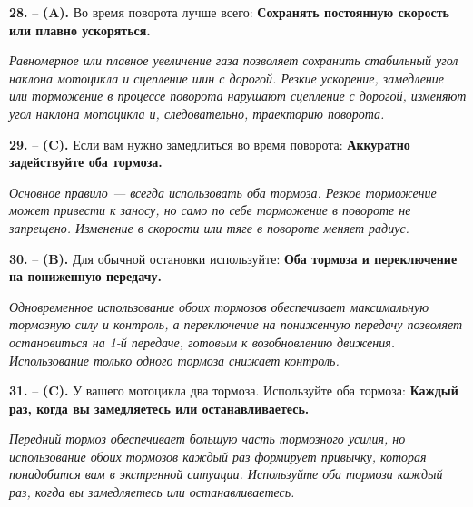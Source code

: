 \begin{minipage}{\linewidth}
\noindent\textbf{28.}  -- \textbf {(A).} Во время поворота лучше всего:  \textbf {Сохранять постоянную скорость или плавно ускоряться.} \par \textit {Равномерное или плавное увеличение газа позволяет сохранить стабильный угол наклона мотоцикла и сцепление шин с дорогой. Резкие ускорение, замедление или торможение в процессе поворота нарушают сцепление с дорогой, изменяют угол наклона мотоцикла и, следовательно, траекторию поворота.} \\
\end{minipage}

\begin{minipage}{\linewidth}
\noindent\textbf{29.}  -- \textbf {(C).} Если вам нужно замедлиться во время поворота:  \textbf {Аккуратно задействуйте оба тормоза.} \par \textit {Основное правило — всегда использовать оба тормоза. Резкое торможение может привести к заносу, но само по себе торможение в повороте не запрещено. Изменение в скорости или тяге в повороте меняет радиус.} \\
\end{minipage}

\begin{minipage}{\linewidth}
\noindent\textbf{30.}  -- \textbf {(B).} Для обычной остановки используйте:  \textbf {Оба тормоза и переключение на пониженную передачу.} \par \textit {Одновременное использование обоих тормозов обеспечивает максимальную тормозную силу и контроль, а переключение на пониженную передачу позволяет остановиться на 1-й передаче, готовым к возобновлению движения. Использование только одного тормоза снижает контроль.} \\
\end{minipage}

\begin{minipage}{\linewidth}
\noindent\textbf{31.}  -- \textbf {(C).} У вашего мотоцикла два тормоза. Используйте оба тормоза:  \textbf {Каждый раз, когда вы замедляетесь или останавливаетесь.} \par \textit {Передний тормоз обеспечивает большую часть тормозного усилия, но использование обоих тормозов каждый раз формирует привычку, которая понадобится вам в экстренной ситуации. Используйте оба тормоза каждый раз, когда вы замедляетесь или останавливаетесь.} \\
\end{minipage}


